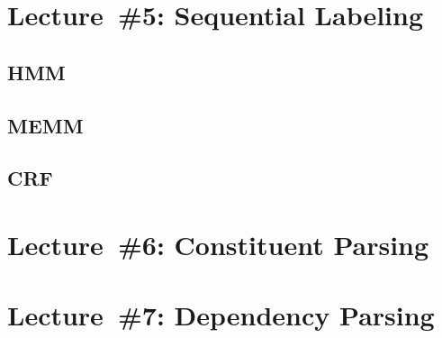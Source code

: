 \documentclass[9pt]{extarticle}
\begin{document}
\begin{multicols}{3}
  \section*{Lecture~\#5: Sequential Labeling}
  \subsection*{HMM}

  \subsection*{MEMM}
  \subsection*{CRF}
  \section*{Lecture~\#6: Constituent Parsing}
  \section*{Lecture~\#7: Dependency Parsing}

\end{multicols}
\end{document}
